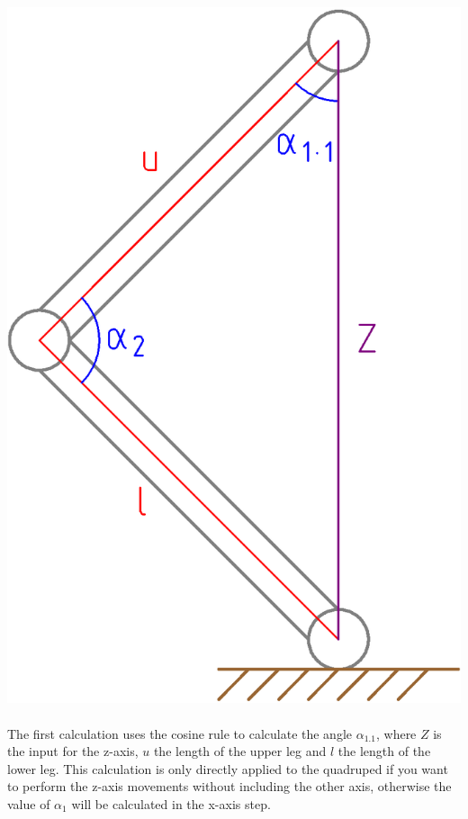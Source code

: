 \documentclass{article}
\begin{document}
    \paragraph{}
    \begin{center}
        \includegraphics[scale=0.2]{z-axis}
    \end{center}

    \paragraph{}
    The first calculation uses the cosine rule to calculate the angle $\alpha_{1.1}$, where $Z$ is the input for the z-axis, $u$ the length of the upper leg and $l$ the length of the lower leg. This calculation is only directly applied to the quadruped if you want to perform the z-axis movements without including the other axis, otherwise the value of $\alpha_1$ will be calculated in the x-axis step.
\end{document}
